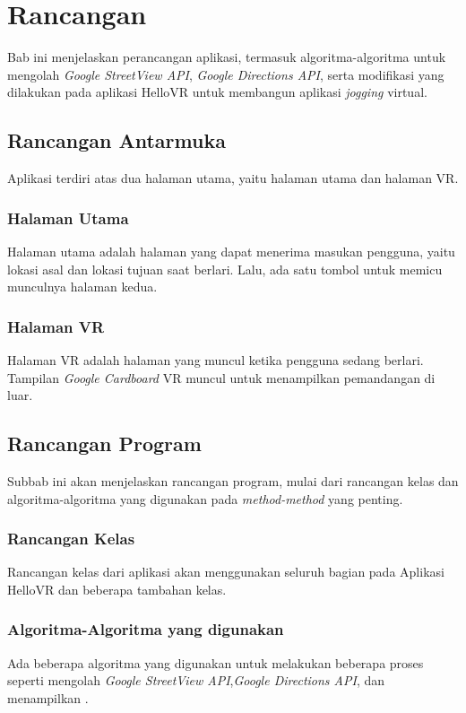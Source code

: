 \chapter{Rancangan}
\label{chap:rancangan}
Bab ini menjelaskan perancangan aplikasi, termasuk algoritma-algoritma untuk mengolah \textit{Google StreetView API}, \textit{Google Directions API}, serta modifikasi yang dilakukan pada aplikasi HelloVR untuk membangun aplikasi \textit{jogging} virtual. 


\section{Rancangan Antarmuka}
Aplikasi terdiri atas dua halaman utama, yaitu halaman utama dan halaman VR.

\subsection{Halaman Utama}
Halaman utama adalah halaman yang dapat menerima masukan pengguna, yaitu lokasi asal dan lokasi tujuan saat berlari. Lalu, ada satu tombol untuk memicu munculnya halaman kedua. 

\subsection{Halaman VR}
Halaman VR adalah halaman yang muncul ketika pengguna sedang berlari. Tampilan \textit{Google Cardboard} VR muncul untuk menampilkan pemandangan di luar. 



\section{Rancangan Program}
Subbab ini akan menjelaskan rancangan  program, mulai dari rancangan kelas dan algoritma-algoritma yang digunakan pada \textit{method-method} yang penting. 

\subsection{Rancangan Kelas}
Rancangan kelas dari aplikasi akan menggunakan seluruh bagian pada Aplikasi HelloVR dan beberapa tambahan kelas. 


\subsection{Algoritma-Algoritma yang digunakan}
Ada beberapa algoritma yang digunakan   untuk melakukan beberapa proses seperti mengolah \textit{Google StreetView API},\textit{Google Directions API}, dan menampilkan .

